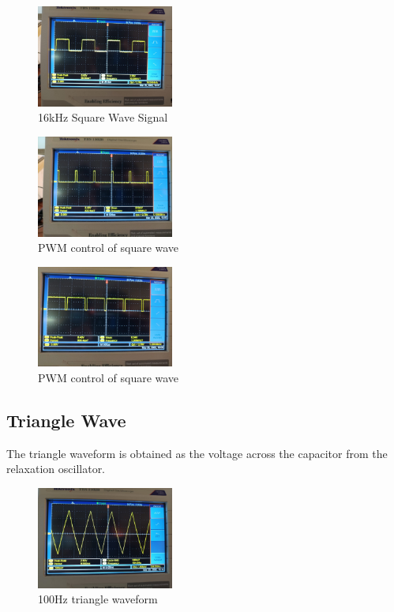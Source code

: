 \documentclass[11pt]{article}
\begin{document}
\begin{multicols}{2}
\begin{figure}[H]
    \centering
    \includegraphics[width=0.4\textwidth]{Square_Wave_16kHz.jpeg}
    \caption{16kHz Square Wave Signal}
    \label{fig:mesh2}
\end{figure}

\begin{figure}[H]
    \centering
    \includegraphics[width=0.4\textwidth]{PWM_1kHz.jpeg}
    \caption{PWM control of square wave}
    \label{fig:mesh3}
\end{figure}

\begin{figure}[H]
    \centering
    \includegraphics[width=0.4\textwidth]{PWM_1kHz_1.jpeg}
    \caption{PWM control of square wave}
    \label{fig:mesh4}
\end{figure}

\subsection*{Triangle Wave}

The triangle waveform is obtained as the voltage across the capacitor from the relaxation oscillator. 

\begin{figure}[H]
    \centering
    \includegraphics[width=0.4\textwidth]{Triangle_100Hz.jpeg}
    \caption{100Hz triangle waveform}
    \label{fig:mesh5}
\end{figure}


\end{multicols}
\end{document}
